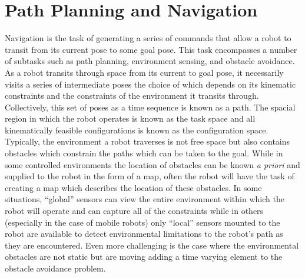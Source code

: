 
\chapter{Path Planning and Navigation}\label{ch:navigation}

Navigation is the task of generating a series of commands that allow a robot to transit from its current pose
to some goal pose. This task encompasses a number of subtasks such as path planning, environment sensing, and obstacle
avoidance. As a robot transits through space from its current to goal pose, it necessarily visits a series
of intermediate poses the choice of which depends on its kinematic constraints and the constraints of the environment it transits through. 
Collectively, this set of poses as a time sequence is known as a path. 
The spacial region in which the robot operates is known as the task space and all kinematically feasible configurations is known as the
configuration space.  Typically, the environment a robot traverses is not free space but also contains obstacles 
which constrain the paths which can be taken to the goal. While in some 
controlled environments the location of obstacles can be known \textit{a priori} and supplied to the robot in the form of a map, often the
robot will have the task of creating a map which describes the location of these obstacles. In some situations, ``global'' 
sensors can view the entire environment within which the robot will operate and can capture all of the constraints while in others (especially
in the case of mobile robots) only ``local'' sensors mounted to the robot are available to detect environmental limitations
to the robot's path as they are encountered. Even more challenging is the case where the environmental obstacles are not
static but are moving adding a time varying element to the obstacle avoidance problem.


